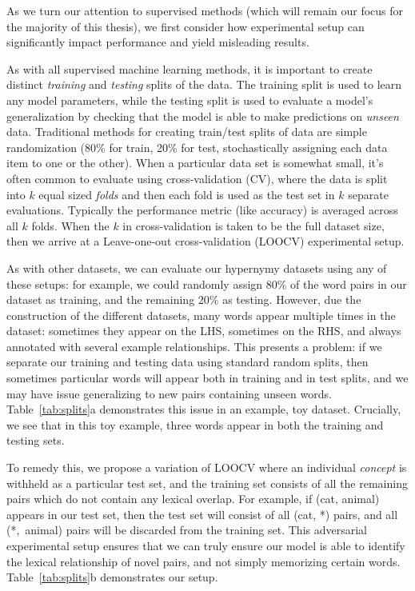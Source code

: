 As we turn our attention to supervised methods (which will remain our focus for
the majority of this thesis), we first consider how experimental setup can
significantly impact performance and yield misleading results.

As with all supervised machine learning methods, it is important to create
distinct {\em training} and {\em testing} splits of the data. The training
split is used to learn any model parameters, while the testing split is used to
evaluate a model's generalization by checking that the model is able to make
predictions on {\em unseen} data. Traditional methods for creating train/test
splits of data are simple randomization (80\% for train, 20\% for test,
stochastically assigning each data item to one or the other). When a particular
data set is somewhat small, it's often common to evaluate using
cross-validation (CV), where the data is split into $k$ equal sized {\em folds}
and then each fold is used as the test set in $k$ separate evaluations.
Typically the performance metric (like accuracy) is averaged across all $k$
folds.  When the $k$ in cross-validation is taken to be the full dataset size,
then we arrive at a Leave-one-out cross-validation (LOOCV) experimental setup.

As with other datasets, we can evaluate our hypernymy datasets using any of
these setups: for example, we could randomly assign 80\% of the word pairs in
our dataset as training, and the remaining 20\% as testing. However, due the
construction of the different datasets, many words appear multiple times in the
dataset: sometimes they appear on the LHS, sometimes on the RHS, and always
annotated with several example relationships. This presents a problem: if we
separate our training and testing data using standard random splits, then
sometimes particular words will appear both in training and in test splits, and
we may have issue generalizing to new pairs containing unseen words.
Table~\ref{tab:splits}a demonstrates this issue in an example, toy dataset.
Crucially, we see that in this toy example, three words appear in both the
training and testing sets.

To remedy this, we propose a variation of LOOCV where an individual {\em
concept} is withheld as a particular test set, and the training set consists of
all the remaining pairs which do not contain any lexical overlap. For example,
if (cat, animal) appears in our test set, then the test set will consist of all
(cat, *) pairs, and all \mbox{(*, animal)} pairs will be discarded from the training
set. This adversarial experimental setup ensures that we can truly ensure our
model is able to identify the lexical relationship of novel pairs, and not
simply memorizing certain words.  Table~\ref{tab:splits}b demonstrates our
setup.

